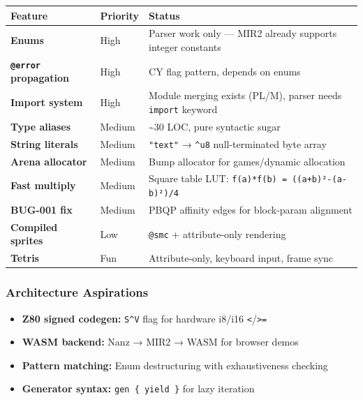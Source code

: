 \documentclass[
  11pt,
  a4paper,
]{report}
\providecommand{\tightlist}{%
  \setlength{\itemsep}{0pt}\setlength{\parskip}{0pt}}
\begin{document}
\begin{longtable}[]{@{}
  >{\raggedright\arraybackslash}p{}
  >{\raggedright\arraybackslash}p{}
  >{\raggedright\arraybackslash}p{}@{}}
\toprule\noalign{}
\begin{minipage}[b]{\linewidth}\raggedright
Feature
\end{minipage} & \begin{minipage}[b]{\linewidth}\raggedright
Priority
\end{minipage} & \begin{minipage}[b]{\linewidth}\raggedright
Status
\end{minipage} \\
\midrule\noalign{}
\endhead
\bottomrule\noalign{}
\endlastfoot
\textbf{Enums} & High & Parser work only --- MIR2 already supports
integer constants \\
\textbf{\texttt{@error} propagation} & High & CY flag pattern, depends
on enums \\
\textbf{Import system} & High & Module merging exists (PL/M), parser
needs \texttt{import} keyword \\
\textbf{Type aliases} & Medium & \textasciitilde30 LOC, pure syntactic
sugar \\
\textbf{String literals} & Medium & \texttt{"text"} → \texttt{\^{}u8}
null-terminated byte array \\
\textbf{Arena allocator} & Medium & Bump allocator for games/dynamic
allocation \\
\textbf{Fast multiply} & Medium & Square table LUT:
\texttt{f(a)*f(b)\ =\ ((a+b)²-(a-b)²)/4} \\
\textbf{BUG-001 fix} & Medium & PBQP affinity edges for block-param
alignment \\
\textbf{Compiled sprites} & Low & \texttt{@smc} + attribute-only
rendering \\
\textbf{Tetris} & Fun & Attribute-only, keyboard input, frame sync \\
\end{longtable}

\subsubsection{Architecture Aspirations}\label{architecture-aspirations}

\begin{itemize}
\tightlist
\item
  \textbf{Z80 signed codegen:} \texttt{S\^{}V} flag for hardware i8/i16
  \texttt{\textless{}}/\texttt{\textgreater{}=}
\item
  \textbf{WASM backend:} Nanz → MIR2 → WASM for browser demos
\item
  \textbf{Pattern matching:} Enum destructuring with exhaustiveness
  checking
\item
  \textbf{Generator syntax:} \texttt{gen\ \{\ yield\ \}} for lazy
  iteration
\end{itemize}
\end{document}
